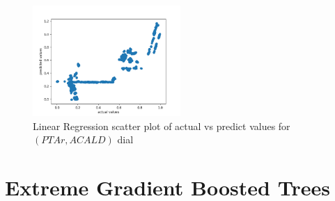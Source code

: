 \documentclass[12pt,chapterheads]{ucsd}
\begin{document}
\begin{figure}[h] 
\centering
\includegraphics[width=0.5\textwidth]{PTAr_ACALD_lr}
\caption[Linear Regression scatter plot of actual vs predict values for $(PTAr, ACALD)$ dial]
{Linear Regression scatter plot of actual vs predict values for $(PTAr, ACALD)$ dial}
\label{fig:PtarAcaldLr}
\end{figure}


\section{Extreme Gradient Boosted Trees} \label{sec:xgboostRes}
\end{document}
